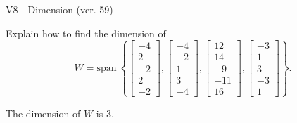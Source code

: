 \begin{exercise}
  \begin{exerciseTitle}V8 - Dimension (ver. 59)\end{exerciseTitle}
  \begin{exerciseStatement}
    Explain how to find the dimension of 
\[W=\mathrm{span}\ \left\{\left[\begin{array}{r}
-4 \\
2 \\
-2 \\
2 \\
-2
\end{array}\right] , \left[\begin{array}{r}
-4 \\
-2 \\
1 \\
3 \\
-4
\end{array}\right] , \left[\begin{array}{r}
12 \\
14 \\
-9 \\
-11 \\
16
\end{array}\right] , \left[\begin{array}{r}
-3 \\
1 \\
3 \\
-3 \\
1
\end{array}\right]\right\}.\]



  \end{exerciseStatement}
  \begin{exerciseAnswer}
   The dimension of \(W\) is  \(3\).
  


  \end{exerciseAnswer}
\end{exercise}